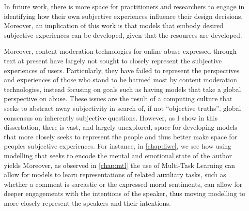 In future work, there is more space for practitioners and researchers to engage in identifying how their own subjective experiences influence their design decisions.
Moreover, an implication of this work is that models that embody desired subjective experiences can be developed, given that the resources  are developed.

Moreover, content moderation technologies for online abuse expressed through text at present have largely not sought to closely represent the subjective experiences of users.
Particularly, they have failed to represent the perspectives and experiences of those who stand to be harmed most by content moderation technologies, instead focusing on goals such as having models that take a global perspective on abuse.
These issues are the result of a computing culture that seeks to abstract away subjectivity in search of, if not ``objective truths'', global consensus on inherently subjective questions.
However, as I show in this dissertation, there is vast, and largely unexplored, space for developing models that more closely seeks to represent the people and thus better make space for peoples subjective experiences.
For instance, in \cref{chap:liwc}, we see how using modelling that seeks to encode the mental and emotional state of the author yields 
Moreover, as observed in \cref{chap:mtl} the use of Multi-Task Learning can allow for models to learn representations of related auxiliary tasks, such as whether a comment is sarcastic or the expressed moral sentiments, can allow for deeper engagements with the intentions of the speaker, thus moving modelling to more closely represent the speakers and their intentions.

